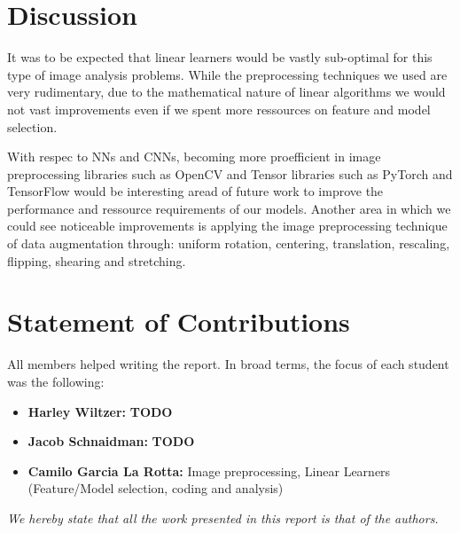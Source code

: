 \documentclass[10pt, hidelinks]{article}
\begin{document}
\section*{Discussion}

It was to be expected that linear learners would be vastly sub-optimal for this type of image analysis problems. While the preprocessing techniques we used are very rudimentary, due to the mathematical nature of linear algorithms we would not vast improvements even if we spent more ressources on feature and model selection.

\noindent With respec to NNs and CNNs, becoming more proefficient in image preprocessing libraries such as OpenCV and Tensor libraries such as PyTorch and TensorFlow would be interesting aread of future work to improve the performance and ressource requirements of our models. Another area in which we could see noticeable improvements is applying the image preprocessing technique of data augmentation through: uniform rotation, centering, translation, rescaling, flipping, shearing and stretching. 


\section*{Statement of Contributions}

All members helped writing the report. In broad terms, the focus of each student was the following:

\begin{itemize}
    \item \textbf{Harley Wiltzer:} \textbf{TODO}
    \item \textbf{Jacob Schnaidman:} \textbf{TODO}
    \item \textbf{Camilo Garcia La Rotta:} Image preprocessing, Linear Learners (Feature/Model selection, coding and analysis)
\end{itemize}

\textit{We hereby state that all the work presented in this report is that of the authors.}
\end{document}
